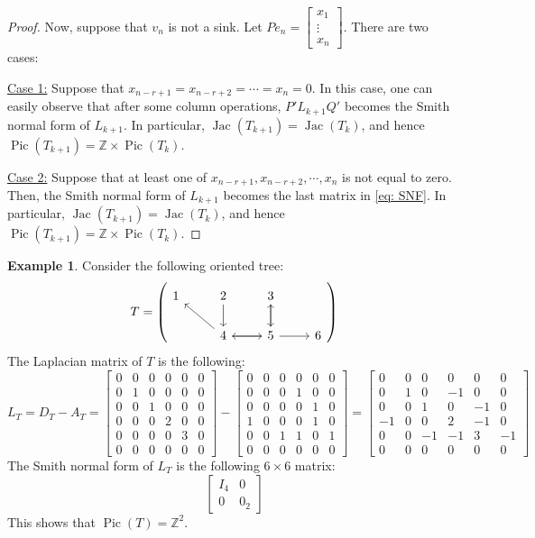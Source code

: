 \documentclass[11pt,reqno]{amsart}
\DeclareMathOperator{\Pic}{Pic}
\DeclareMathOperator{\Jac}{Jac}
\theoremstyle{definition}
\newtheorem{myeg}[mydef]{Example}
\theoremstyle{plain}
\begin{document}
\begin{proof}
Now, suppose that $v_n$ is not a sink. Let $Pe_n=\begin{bmatrix}
	x_1\\
	\vdots \\
	x_{n}
\end{bmatrix}$. There are two cases:

\noindent \underline{Case 1:} Suppose that $x_{n-r+1}=x_{n-r+2}=\cdots=x_n=0$. In this case, one can easily observe that after some column operations, $P'L_{k+1}Q'$ becomes the Smith normal form of $L_{k+1}$. In particular, $\Jac(T_{k+1})=\Jac(T_k)$, and hence $\Pic(T_{k+1})=\mathbb{Z}\times \Pic(T_k)$. 

\noindent \underline{Case 2:} Suppose that at least one of $x_{n-r+1}, x_{n-r+2},\cdots, x_n$ is not equal to zero. Then, the Smith normal form of $L_{k+1}$ becomes the last matrix in \eqref{eq: SNF}. In particular, $\Jac(T_{k+1})=\Jac(T_k)$, and hence $\Pic(T_{k+1})=\mathbb{Z}\times \Pic(T_k)$. 
\end{proof}

\begin{myeg}\label{example: oriented tree}
Consider the following oriented tree:
\[
T=\left(\begin{tikzcd}
1
	& 2 \arrow[d,swap] &  3 \arrow[d] & \\
	& 4\arrow[r,swap] \arrow[ul] & 5 \arrow[l] \arrow[u]\arrow[r,swap] & 6
\end{tikzcd}\right)
\]
The Laplacian matrix of $T$ is the following:
\[
L_T = D_T - A_T = \begin{bmatrix}
0& 0& 0& 0& 0&0 \\
0& 1&0 & 0& 0&0 \\
0& 0& 1& 0& 0&0 \\
0&0 &0 &2 &0 & 0\\
0&0 &0 &0 &3 &0 \\
0& 0& 0& 0& 0&0
\end{bmatrix} - \begin{bmatrix}
0 & 0& 0& 0& 0& 0\\
0& 0& 0&1 &0 & 0\\
0&0 &0 &0 &1 &0 \\
1& 0& 0& 0&1 &0 \\
0& 0& 1&1 &0 &1 \\
0& 0& 0& 0& 0& 0
\end{bmatrix} = \begin{bmatrix}
0&0 &0 &0 &0 &0 \\
0&1 &0 &-1 &0 &0 \\
0& 0& 1&0 &-1 &0 \\
-1& 0& 0& 2&-1 &0 \\
0&0 &-1 &-1 &3 &-1 \\
0& 0&0 &0 &0 &0
\end{bmatrix}
\]
The Smith normal form of $L_T$ is the following $6\times 6$ matrix:
\[
\left[\begin{array}{c|c}
	I_4 & 0 \\ \hline
	0 & 0_2
\end{array}\right]
\]
This shows that $\Pic(T)=\mathbb{Z}^2$.
\end{myeg}
\end{document}
